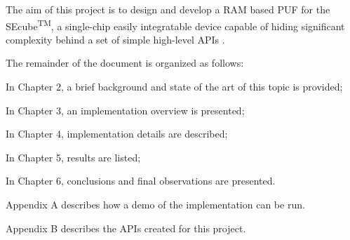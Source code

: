 The aim of this project is to design and develop a RAM based PUF for the SEcube\textsuperscript{TM}, a single-chip easily integratable device capable of hiding significant complexity behind a set of simple high-level APIs \cite{SEcube_Prinetto}.

\vspace{1.5em}
The remainder of the document is organized as follows:
\vspace{1em}

In Chapter 2, a brief background and state of the art of this topic is provided; 

In Chapter 3, an implementation  overview is presented;

In Chapter 4, implementation details are described;

In Chapter 5, results are listed;

In Chapter 6, conclusions and final observations are presented.

Appendix A describes how a demo of the implementation can be run.

Appendix B describes the APIs created for this project.






